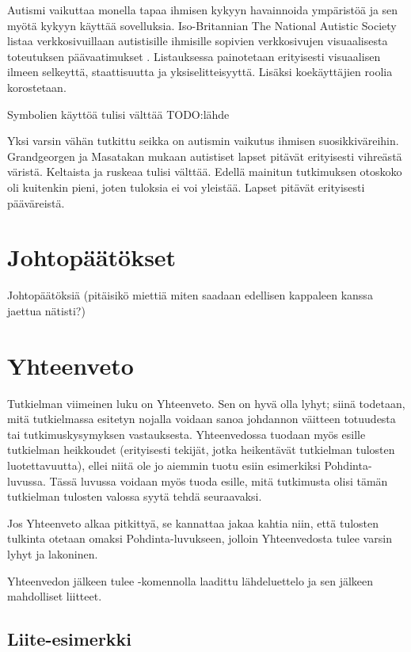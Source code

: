 \documentclass[utf8]{gradu3}
\begin{document}
Autismi vaikuttaa monella tapaa ihmisen kykyyn havainnoida ympäristöä ja sen myötä kykyyn käyttää sovelluksia. Iso-Britannian The National Autistic Society listaa verkkosivuillaan autistisille ihmisille sopivien verkkosivujen visuaalisesta toteutuksen päävaatimukset \parencite[]{autism-friendly-websites}. Listauksessa painotetaan erityisesti visuaalisen ilmeen selkeyttä, staattisuutta ja yksiselitteisyyttä. Lisäksi koekäyttäjien roolia korostetaan.

Symbolien käyttöä tulisi välttää TODO:lähde

Yksi varsin vähän tutkittu seikka on autismin vaikutus ihmisen suosikkiväreihin. Grandgeorgen ja Masatakan \parencite[]{color-preference-autism} mukaan autistiset lapset pitävät erityisesti vihreästä väristä. Keltaista ja ruskeaa tulisi välttää. Edellä mainitun tutkimuksen otoskoko oli kuitenkin pieni, joten tuloksia ei voi yleistää. Lapset pitävät erityisesti pääväreistä.

\chapter{Johtopäätökset}

Johtopäätöksiä (pitäisikö miettiä miten saadaan edellisen kappaleen kanssa jaettua nätisti?)

\chapter{Yhteenveto}

Tutkielman viimeinen luku on Yhteenveto.  Sen on hyvä olla lyhyt;
siinä todetaan, mitä tutkielmassa esitetyn nojalla voidaan sanoa
johdannon väitteen totuudesta tai tutkimuskysymyksen vastauksesta.
Yhteenvedossa tuodaan myös esille tutkielman heikkoudet (erityisesti
tekijät, jotka heikentävät tutkielman tulosten luotettavuutta), ellei
niitä ole jo aiemmin tuotu esiin esimerkiksi Pohdinta-luvussa.  Tässä
luvussa voidaan myös tuoda esille, mitä tutkimusta olisi tämän
tutkielman tulosten valossa syytä tehdä seuraavaksi.

Jos Yhteenveto alkaa pitkittyä, se kannattaa jakaa kahtia niin, että
tulosten tulkinta otetaan omaksi Pohdinta-luvukseen, jolloin
Yhteenvedosta tulee varsin lyhyt ja lakoninen.

Yhteenvedon jälkeen tulee \string\printbibliography-komennolla
laadittu lähdeluettelo ja sen jälkeen mahdolliset liitteet.

\printbibliography

\appendix
\section{Liite-esimerkki}
\end{document}
